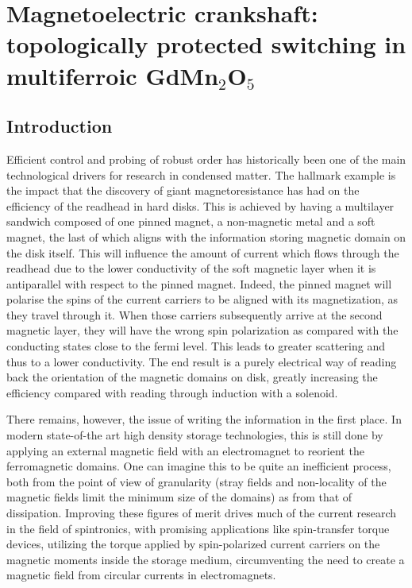\chapter{Magnetoelectric crankshaft: topologically protected switching in multiferroic GdMn$_2$O$_5$}
\section{Introduction}
Efficient control and probing of robust order has historically been one of the main technological drivers for research in condensed matter.
The hallmark example is the impact that the discovery of giant magnetoresistance has had on the efficiency of the readhead in hard disks.
This is achieved by having a multilayer sandwich composed of one pinned magnet, a non-magnetic metal and a soft magnet, the last of which aligns with the information storing magnetic domain on the disk itself.
This will influence the amount of current which flows through the readhead due to the lower conductivity of the soft magnetic layer when it is antiparallel with respect to the pinned magnet. Indeed, the pinned magnet will polarise the spins of the current carriers to be aligned with its magnetization, as they travel through it. When those carriers subsequently arrive at the second magnetic layer, they will have the wrong spin polarization as compared with the conducting states close to the fermi level. This leads to greater scattering and thus to a lower conductivity.
The end result is a purely electrical way of reading back the orientation of the magnetic domains on disk, greatly increasing the efficiency compared with reading through induction with a solenoid.

There remains, however, the issue of writing the information in the first place.
In modern state-of-the art high density storage technologies, this is still done by applying an external magnetic field with an electromagnet to reorient the ferromagnetic domains. One can imagine this to be quite an inefficient process, both from the point of view of granularity (stray fields and non-locality of the magnetic fields limit the minimum size of the domains) as from that of dissipation.
Improving these figures of merit drives much of the current research in the field of spintronics, with promising applications like spin-transfer torque devices, utilizing the torque applied by spin-polarized current carriers on the magnetic moments inside the storage medium, circumventing the need to create a magnetic field from circular currents in electromagnets.

